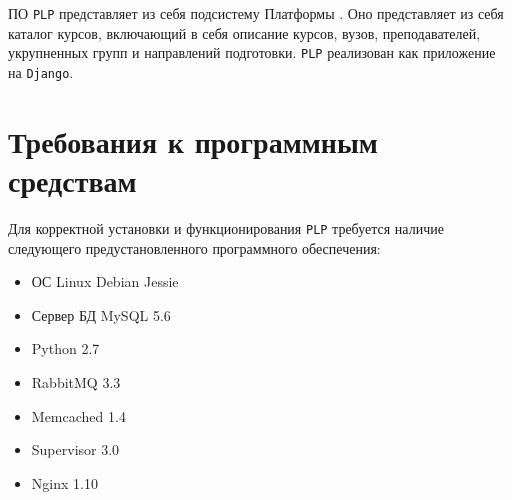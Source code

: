 ПО \texttt{PLP} представляет из себя подсистему Платформы . Оно представляет из себя каталог курсов, включающий в себя описание курсов, вузов, преподавателей, укрупненных групп и направлений подготовки.
\texttt{PLP} реализован как приложение на \texttt{Django}.

\section{Требования к программным средствам}
Для корректной установки и функционирования \texttt{PLP} требуется наличие следующего предустановленного программного обеспечения:

\begin{itemize}
	\item ОС Linux Debian Jessie
	\item Сервер БД MySQL 5.6
	\item Python 2.7
	\item RabbitMQ 3.3
	\item Memcached 1.4
	\item Supervisor 3.0
	\item Nginx 1.10
\end{itemize}
